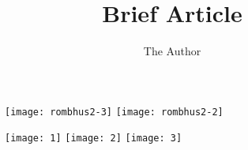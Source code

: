 \documentclass[11pt, oneside]{article}   	%
\title{Brief Article}
\author{The Author}
\begin{document}
\begin{figure}[htbp] %
   \centering
   \texttt{[image: rombhus2-3]}%
   \texttt{[image: rombhus2-2]} 
\end{figure}

\begin{figure}[htbp] %
   \centering
   \texttt{[image: 1]}%
   \texttt{[image: 2]}%
   \texttt{[image: 3]}%
\end{figure}
\end{document}
